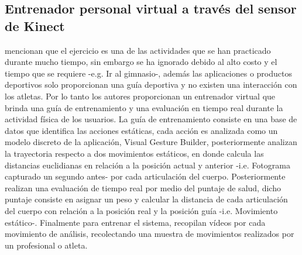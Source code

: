 \subsection{Entrenador personal virtual a trav\'es del sensor de Kinect} \label{tr:6}
 mencionan que el ejercicio es una de las actividades que se han practicado durante mucho tiempo, sin embargo se ha ignorado debido al alto costo y el tiempo que se requiere -e.g. Ir al gimnasio-, adem\'as las aplicaciones o productos deportivos solo proporcionan una gu\'ia deportiva y no existen una interacci\'on con los atletas. Por lo tanto los autores proporcionan un entrenador virtual que brinda una gu\'ia de entrenamiento y una evaluaci\'on en tiempo real durante la actividad f\'isica de los usuarios.
\medbreak
La gu\'ia de entrenamiento consiste en una base de datos que identifica las acciones est\'aticas, cada acci\'on es analizada como un modelo discreto de la aplicaci\'on, Visual Gesture Builder, posteriormente analizan la trayectoria  respecto a dos movimientos est\'aticos, en donde calcula las distancias euclidianas en relaci\'on a la posici\'on actual y anterior -i.e. Fotograma capturado un segundo antes- por cada articulaci\'on del cuerpo.
\medbreak 
Posteriormente realizan una evaluaci\'on de tiempo real por medio del puntaje de salud, dicho puntaje consiste en asignar un peso y calcular la distancia de cada articulaci\'on del cuerpo con relaci\'on a  la posici\'on real y la posici\'on gu\'ia -i.e. Movimiento est\'atico-.
\medbreak 
Finalmente para entrenar el sistema,  recopilan v\'ideos por cada movimiento de an\'alisis, recolectando una muestra  de movimientos realizados por un profesional o atleta.
